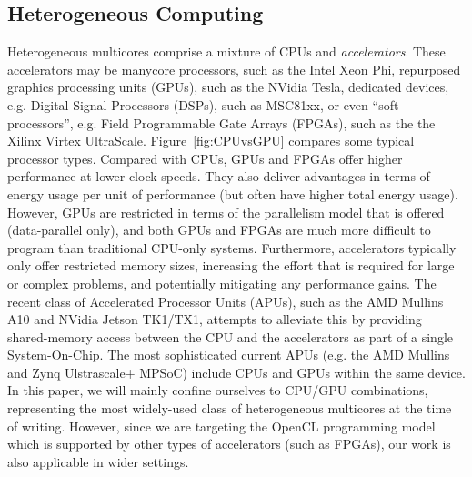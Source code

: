 \documentclass[final]{jfp1}
\begin{document}
\subsection{Heterogeneous Computing}

Heterogeneous multicores comprise a mixture of CPUs and \emph{accelerators}.
These accelerators may be manycore processors, such as the Intel Xeon Phi,
repurposed graphics processing units (GPUs), such as the NVidia Tesla,
dedicated devices, e.g. Digital Signal Processors (DSPs), such as MSC81xx,
or even ``soft processors'', e.g. Field Programmable Gate Arrays (FPGAs),
such as the the Xilinx Virtex UltraScale.  Figure~\ref{fig:CPUvsGPU} compares some typical
processor types. Compared with CPUs, GPUs and FPGAs offer higher performance at
lower clock speeds.  They also deliver advantages in terms of energy usage
per unit of performance (but often have higher total energy usage).
However, GPUs are restricted in terms of the parallelism model that is
offered (data-parallel only), and both GPUs and FPGAs are much more difficult
to program than traditional CPU-only systems.  Furthermore, accelerators
typically only offer restricted memory sizes, increasing the effort that
is required for large or complex problems, and potentially mitigating any
performance gains.  The recent class of Accelerated Processor Units (APUs),
such as the AMD Mullins A10 and NVidia Jetson TK1/TX1, 
attempts to alleviate this by providing shared-memory
access between the CPU and the accelerators as
part of a single System-On-Chip.
The most sophisticated current APUs (e.g. the AMD Mullins and Zynq Ulstrascale+ MPSoC) include CPUs and GPUs within
the same device.
In this paper, we will mainly confine ourselves to CPU/GPU combinations, 
representing the most widely-used class of heterogeneous multicores at the time of writing.
However, since we are targeting the OpenCL programming model which is supported by other
types of accelerators (such as FPGAs), our work is also applicable in wider settings.
\end{document}
